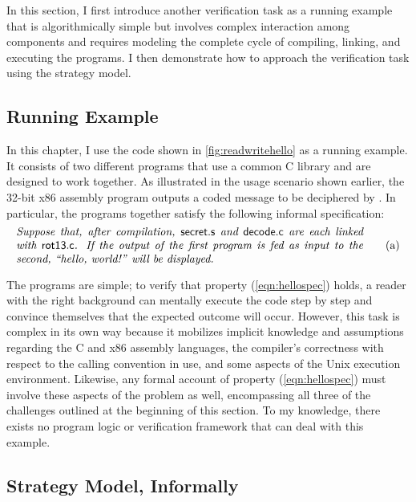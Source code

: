 In this section,
I first introduce
another verification task
as a running example
that is algorithmically simple
but involves complex interaction among components
and requires modeling
the complete cycle of compiling, linking, and executing
the programs.
I then demonstrate
how to approach the verification task
using the strategy model.

\subsection{Running Example}

In this chapter,
I use the code shown in \autoref{fig:readwritehello}
as a running example.
It consists of two different programs that
use a common C library and
are designed to work together.
As illustrated in the usage scenario shown earlier,
the 32-bit x86 assembly program 
outputs a coded message
to be deciphered by .
In particular,
the programs together satisfy the following informal specification:
\begin{equation}
  \begin{minipage}{.9\textwidth}
    \it
    Suppose that,
    after compilation,
    \kw{secret.s} and \kw{decode.c}
    are each linked with \kw{rot13.c}.
    If the output of the first program
    is fed as input to the second,
    ``hello, world!'' will be displayed.
  \end{minipage}
  \tag{a}
  \label{eqn:hellospec}
\end{equation}

The programs are simple;
to verify that property (\ref{eqn:hellospec}) holds,
a reader with the right background
can mentally execute the code step by step
and convince themselves that the expected outcome will occur.
However, this task is complex in its own way
because it mobilizes implicit knowledge and assumptions regarding
the C and x86 assembly languages,
the compiler's correctness with respect to the calling convention in use,
and some aspects of the Unix execution environment.
%
Likewise, any formal account of property (\ref{eqn:hellospec})
must involve these aspects of the problem as well,
encompassing all three of the challenges outlined at the beginning of this section.
To my knowledge,
there exists no program logic or verification framework
that can deal with this example.

\subsection{Strategy Model, Informally}

